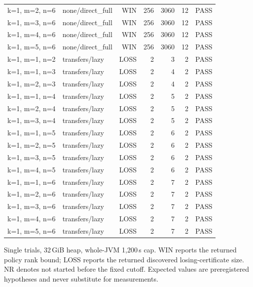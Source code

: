 \begin{longtable}{llrrrrl}
k=1, m=2, n=6 & none/direct\_full & WIN & 256 & 3060 & 12 & PASS \\
k=1, m=3, n=6 & none/direct\_full & WIN & 256 & 3060 & 12 & PASS \\
k=1, m=4, n=6 & none/direct\_full & WIN & 256 & 3060 & 12 & PASS \\
k=1, m=5, n=6 & none/direct\_full & WIN & 256 & 3060 & 12 & PASS \\
k=1, m=1, n=2 & transfers/lazy & LOSS & 2 & 3 & 2 & PASS \\
k=1, m=1, n=3 & transfers/lazy & LOSS & 2 & 4 & 2 & PASS \\
k=1, m=2, n=3 & transfers/lazy & LOSS & 2 & 4 & 2 & PASS \\
k=1, m=1, n=4 & transfers/lazy & LOSS & 2 & 5 & 2 & PASS \\
k=1, m=2, n=4 & transfers/lazy & LOSS & 2 & 5 & 2 & PASS \\
k=1, m=3, n=4 & transfers/lazy & LOSS & 2 & 5 & 2 & PASS \\
k=1, m=1, n=5 & transfers/lazy & LOSS & 2 & 6 & 2 & PASS \\
k=1, m=2, n=5 & transfers/lazy & LOSS & 2 & 6 & 2 & PASS \\
k=1, m=3, n=5 & transfers/lazy & LOSS & 2 & 6 & 2 & PASS \\
k=1, m=4, n=5 & transfers/lazy & LOSS & 2 & 6 & 2 & PASS \\
k=1, m=1, n=6 & transfers/lazy & LOSS & 2 & 7 & 2 & PASS \\
k=1, m=2, n=6 & transfers/lazy & LOSS & 2 & 7 & 2 & PASS \\
k=1, m=3, n=6 & transfers/lazy & LOSS & 2 & 7 & 2 & PASS \\
k=1, m=4, n=6 & transfers/lazy & LOSS & 2 & 7 & 2 & PASS \\
k=1, m=5, n=6 & transfers/lazy & LOSS & 2 & 7 & 2 & PASS \\
\bottomrule
\end{longtable}
{\par\smallskip\footnotesize Single trials, 32\,GiB heap, whole-JVM 1,200\,s cap. WIN reports the returned policy rank bound; LOSS reports the returned discovered losing-certificate size. NR denotes not started before the fixed cutoff. Expected values are preregistered hypotheses and never substitute for measurements.}
